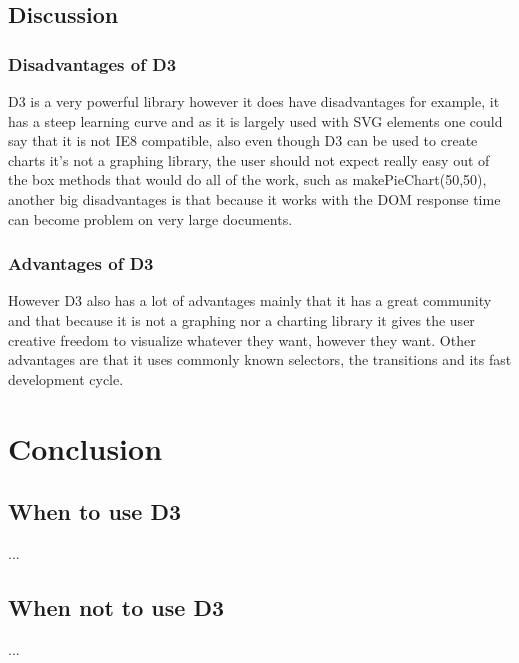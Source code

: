 \documentclass{bioinfo}
\begin{document}
\subsection{Discussion}
\subsubsection{Disadvantages of D3}
D3 is a very powerful library however it does have disadvantages for example, it has a steep learning curve and as it is largely used with SVG elements one could say that it is not IE8 compatible, also even though D3 can be used to create charts it’s not a graphing library, the user should not expect really easy out of the box methods that would do all of the work, such as makePieChart(50,50), another big disadvantages is that because it works with the DOM response time can become problem on very large documents.

\subsubsection{Advantages of D3}
However D3 also has a lot of advantages mainly that it has a great community and that because it is not a graphing nor a charting library it gives the user creative freedom to visualize whatever they want, however they want. Other advantages are that it uses commonly known selectors, the transitions and its fast development cycle.


\section{Conclusion}
\subsection{When to use D3}
...
\subsection{When not to use D3}
...




%
%
%
%
%
%
%
%
%

\end{document}
